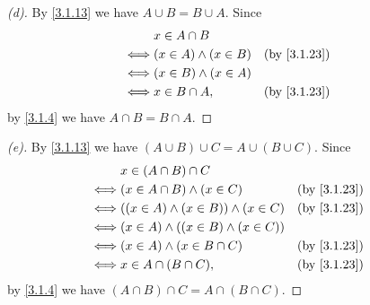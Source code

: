\begin{proof}[(d)]
  By \cref{3.1.13} we have \(A \cup B = B \cup A\).
  Since
  \begin{align*}
         & x \in A \cap B                             \\
    \iff & (x \in A) \land (x \in B) &  & \by{3.1.23} \\
    \iff & (x \in B) \land (x \in A)                  \\
    \iff & x \in B \cap A,           &  & \by{3.1.23}
  \end{align*}
  by \cref{3.1.4} we have \(A \cap B = B \cap A\).
\end{proof}

\begin{proof}[(e)]
  By \cref{3.1.13} we have \((A \cup B) \cup C = A \cup (B \cup C)\).
  Since
  \begin{align*}
         & x \in (A \cap B) \cap C                                      \\
    \iff & (x \in A \cap B) \land (x \in C)            &  & \by{3.1.23} \\
    \iff & ((x \in A) \land (x \in B)) \land (x \in C) &  & \by{3.1.23} \\
    \iff & (x \in A) \land ((x \in B) \land (x \in C))                  \\
    \iff & (x \in A) \land (x \in B \cap C)            &  & \by{3.1.23} \\
    \iff & x \in A \cap (B \cap C),                    &  & \by{3.1.23}
  \end{align*}
  by \cref{3.1.4} we have \((A \cap B) \cap C = A \cap (B \cap C)\).
\end{proof}

